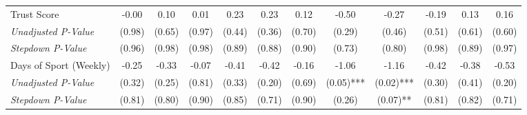 \begin{tabular}{l c c c c c c c c c c c}
Trust Score & -0.00 & 0.10 & 0.01 & 0.23 & 0.23 & 0.12 & -0.50 & -0.27 & -0.19 & 0.13 & 0.16 \\
\quad \textit{Unadjusted P-Value} & (0.98) & (0.65) & (0.97) & (0.44) & (0.36) & (0.70) & (0.29) & (0.46) & (0.51) & (0.61) & (0.60) \\
\quad \textit{Stepdown P-Value} & (0.96) & (0.98) & (0.98) & (0.89) & (0.88) & (0.90) & (0.73) & (0.80) & (0.98) & (0.89) & (0.97) \\
Days of Sport (Weekly) & -0.25 & -0.33 & -0.07 & -0.41 & -0.42 & -0.16 & -1.06 & -1.16 & -0.42 & -0.38 & -0.53 \\
\quad \textit{Unadjusted P-Value} & (0.32) & (0.25) & (0.81) & (0.33) & (0.20) & (0.69) & (0.05)*** & (0.02)*** & (0.30) & (0.41) & (0.20) \\
\quad \textit{Stepdown P-Value} & (0.81) & (0.80) & (0.90) & (0.85) & (0.71) & (0.90) & (0.26) & (0.07)** & (0.81) & (0.82) & (0.71) \\
\bottomrule
\end{tabular}
